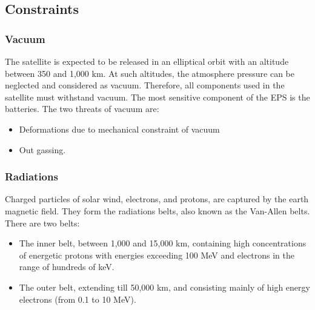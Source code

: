 \subsection{Constraints} 

\subsubsection{Vacuum}

The satellite is expected to be released in an elliptical orbit with an altitude between 350 and 1,000 km. At such altitudes, the atmosphere pressure can be neglected and considered as vacuum. Therefore, all components used in the satellite must withstand vacuum. The most sensitive component of the EPS is the batteries. The two threats of vacuum are:
\begin{itemize}
\item Deformations due to mechanical constraint of vacuum
\item Out gassing.
\end{itemize}

\subsubsection{Radiations}

Charged particles of solar wind, electrons, and protons, are captured by the earth magnetic field. They form the radiations belts, also known as the Van-Allen belts. There are two belts:
\begin{itemize}
\item The inner belt, between 1,000 and 15,000 km, containing high concentrations of energetic protons with energies exceeding 100 MeV and electrons in the range of hundreds of keV.
\item The outer belt, extending till 50,000 km, and consisting mainly of high energy electrons (from 0.1 to 10 MeV).
\end{itemize}

